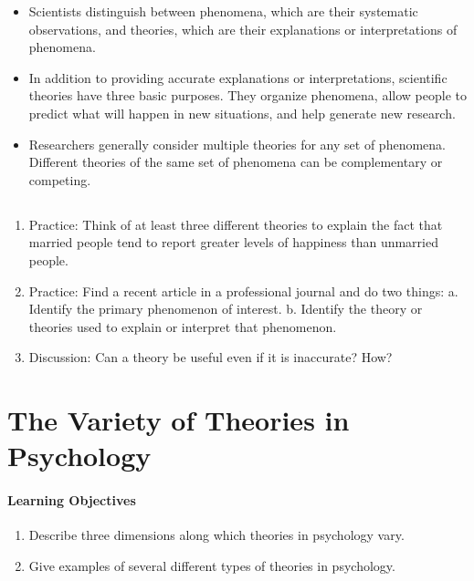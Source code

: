 \begin{itemize}
\item Scientists distinguish between phenomena, which are their systematic observations, and theories, which are their explanations or interpretations of phenomena.
\item In addition to providing accurate explanations or interpretations, scientific theories have three basic purposes. They organize phenomena, allow people to predict what will happen in new situations, and help generate new research.
\item Researchers generally consider multiple theories for any set of phenomena. Different theories of the same set of phenomena can be complementary or competing.
\end{itemize}

\subsection{}

\begin{fullwidth}

\begin{enumerate}

\item Practice: Think of at least three different theories to explain the fact that married people tend to report greater levels of happiness than unmarried people.

\item Practice: Find a recent article in a professional journal and do two things:
a. Identify the primary phenomenon of interest.
b. Identify the theory or theories used to explain or interpret that phenomenon.
\item Discussion: Can a theory be useful even if it is inaccurate? How?
\end{enumerate}
\end{fullwidth}

\newpage
\section{The Variety of Theories in Psychology}

 \paragraph{Learning Objectives}
 \begin{enumerate}
 \item Describe three dimensions along which theories in psychology vary.
 \item Give examples of several different types of theories in psychology.
   \end{enumerate}



